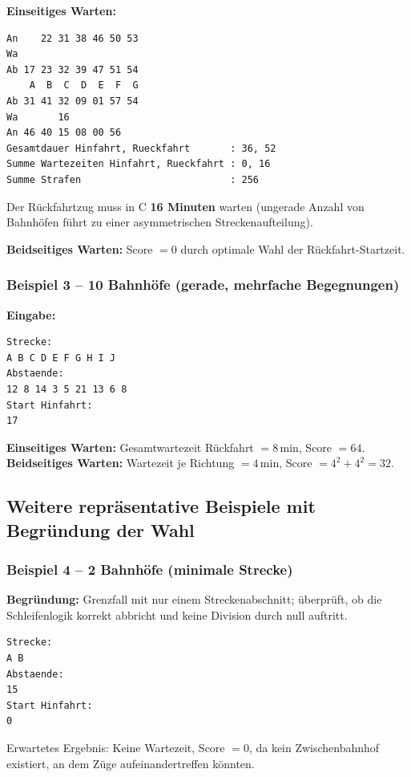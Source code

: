 \documentclass[12pt,a4paper]{article}
\begin{document}
\textbf{Einseitiges Warten:}
\begin{lstlisting}
An    22 31 38 46 50 53
Wa
Ab 17 23 32 39 47 51 54
    A  B  C  D  E  F  G
Ab 31 41 32 09 01 57 54
Wa       16
An 46 40 15 08 00 56
Gesamtdauer Hinfahrt, Rueckfahrt       : 36, 52
Summe Wartezeiten Hinfahrt, Rueckfahrt : 0, 16
Summe Strafen                          : 256
\end{lstlisting}

Der Rückfahrtzug muss in C \textbf{16 Minuten} warten (ungerade Anzahl von
Bahnhöfen führt zu einer asymmetrischen Streckenaufteilung).

\textbf{Beidseitiges Warten:} Score $= 0$ durch optimale Wahl der Rückfahrt-Startzeit.

\subsubsection{Beispiel 3 -- 10 Bahnhöfe (gerade, mehrfache Begegnungen)}

\textbf{Eingabe:}
\begin{lstlisting}
Strecke:
A B C D E F G H I J
Abstaende:
12 8 14 3 5 21 13 6 8
Start Hinfahrt:
17
\end{lstlisting}

\textbf{Einseitiges Warten:} Gesamtwartezeit Rückfahrt $= 8\,\text{min}$,
Score $= 64$.\\
\textbf{Beidseitiges Warten:} Wartezeit je Richtung $= 4\,\text{min}$,
Score $= 4^2 + 4^2 = 32$.

\subsection{Weitere repräsentative Beispiele mit Begründung der Wahl}

\subsubsection{Beispiel 4 -- 2 Bahnhöfe (minimale Strecke)}

\textbf{Begründung:} Grenzfall mit nur einem Streckenabschnitt; überprüft, ob
die Schleifenlogik korrekt abbricht und keine Division durch null auftritt.

\begin{lstlisting}
Strecke:
A B
Abstaende:
15
Start Hinfahrt:
0
\end{lstlisting}

Erwartetes Ergebnis: Keine Wartezeit, Score $= 0$, da kein Zwischenbahnhof
existiert, an dem Züge aufeinandertreffen könnten.
\end{document}

